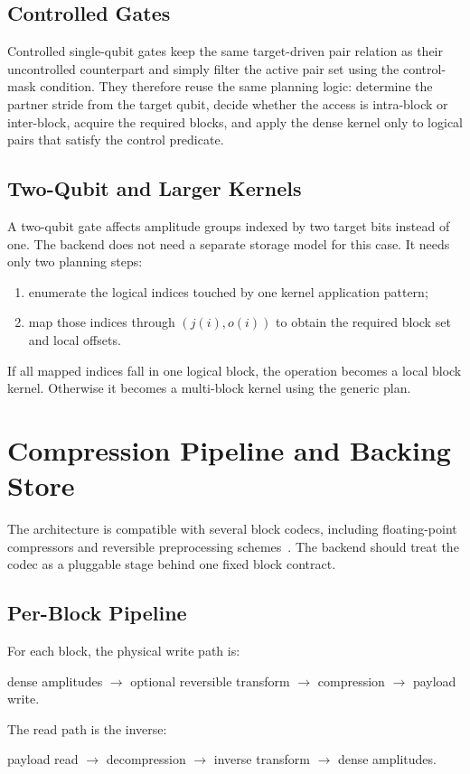 \documentclass[runningheads]{llncs}
\begin{document}
\subsection{Controlled Gates}

Controlled single-qubit gates keep the same target-driven pair relation as their uncontrolled counterpart and simply filter the active pair set using the control-mask condition. They therefore reuse the same planning logic: determine the partner stride from the target qubit, decide whether the access is intra-block or inter-block, acquire the required blocks, and apply the dense kernel only to logical pairs that satisfy the control predicate.

\subsection{Two-Qubit and Larger Kernels}

A two-qubit gate affects amplitude groups indexed by two target bits instead of one. The backend does not need a separate storage model for this case. It needs only two planning steps:
\begin{enumerate}[leftmargin=1.5em]
  \item enumerate the logical indices touched by one kernel application pattern;
  \item map those indices through $(j(i),o(i))$ to obtain the required block set and local offsets.
\end{enumerate}
If all mapped indices fall in one logical block, the operation becomes a local block kernel. Otherwise it becomes a multi-block kernel using the generic plan.

\section{Compression Pipeline and Backing Store}

The architecture is compatible with several block codecs, including floating-point compressors and reversible preprocessing schemes~\cite{burtscher2009fpc,lindstrom2006fpzip,masui2015bitshuffle}. The backend should treat the codec as a pluggable stage behind one fixed block contract.

\subsection{Per-Block Pipeline}

For each block, the physical write path is:
\begin{center}
  dense amplitudes $\rightarrow$ optional reversible transform $\rightarrow$ compression $\rightarrow$ payload write.
\end{center}
The read path is the inverse:
\begin{center}
  payload read $\rightarrow$ decompression $\rightarrow$ inverse transform $\rightarrow$ dense amplitudes.
\end{center}
\end{document}
